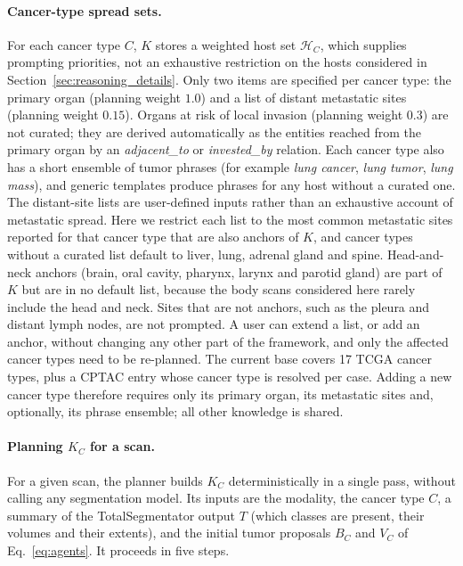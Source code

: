 \documentclass[fleqn,10pt]{olplainarticle}
\begin{document}
\paragraph{Cancer-type spread sets.}
For each cancer type $C$, $K$ stores a weighted host set $\mathcal{H}_C$, which supplies prompting priorities, not an exhaustive restriction on the hosts considered in
Section~\ref{sec:reasoning_details}. Only two items are specified per cancer type: the primary organ (planning weight $1.0$) and a list of
distant metastatic sites (planning weight $0.15$). Organs at risk of local invasion (planning weight $0.3$) are not curated; they are
derived automatically as the entities reached from the primary organ by an \emph{adjacent\_to} or \emph{invested\_by}
relation. Each cancer type also has a short ensemble of tumor phrases (for example \emph{lung cancer}, \emph{lung
tumor}, \emph{lung mass}), and generic templates produce phrases for any host without a curated one. The distant-site lists are user-defined inputs rather than an exhaustive account of metastatic spread. Here we
restrict each list to the most common metastatic sites reported for that cancer type that are also anchors of $K$, and
cancer types without a curated list default to liver, lung, adrenal gland and spine. Head-and-neck anchors (brain, oral cavity,
pharynx, larynx and parotid gland) are part of $K$ but are in no default list, because the body scans considered here
rarely include the head and neck. Sites that are not anchors, such
as the pleura and distant lymph nodes, are not prompted. A user can extend a list, or add an anchor, without changing any other part of the framework, and only the affected cancer types need to be re-planned. The current
base covers 17 TCGA cancer types, plus a CPTAC entry whose cancer type is resolved per case. Adding a new cancer type
therefore requires only its primary organ, its metastatic sites and, optionally, its phrase ensemble; all other
knowledge is shared.

\paragraph{Planning $K_C$ for a scan.}
For a given scan, the planner builds $K_C$ deterministically in a single pass, without calling any segmentation model.
Its inputs are the modality, the cancer type $C$, a summary of the TotalSegmentator output $T$ (which classes are
present, their volumes and their extents), and the initial tumor proposals $B_C$ and $V_C$ of Eq.~\eqref{eq:agents}.
It proceeds in five steps.
\end{document}

